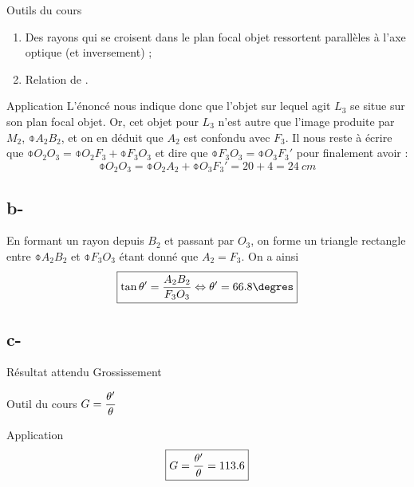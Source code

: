 \documentclass[10pt,a5paper,notitlepage]{book}
\begin{document}
\begin{NCdemo}{Outils du cours}
    \begin{enumerate}

        \item Des rayons qui se croisent dans le plan focal objet ressortent
            parallèles à l'axe optique (et inversement) ;

        \item Relation de .
    \end{enumerate}
\end{NCdemo}

\begin{NCexem}{Application}
    L'énoncé nous indique donc que l'objet sur lequel agit $L_3$ se situe sur
    son plan focal objet. Or, cet objet pour $L_3$ n'est autre que l'image
    produite par $M_2$, $\obar{A_2B_2}$, et on en déduit que $A_2$ est confondu
    avec $F_3$. Il nous reste à écrire que $\obar{O_2O_3} = \obar{O_2F_3} +
    \obar{F_3O_3}$ et dire que $\obar{F_3O_3} = \obar{O_3F_3'}$ pour finalement
    avoir :
    \[ \boxed{\obar{O_2O_3} = \obar{O_2A_2} + \obar{O_3F_3'} = 20 + 4 =
    \SI{24}{cm}} \]
\end{NCexem}

\setcounter{subsection}{2}
\subsection{b-}
En formant un rayon depuis $B_2$ et passant par $O_3$, on forme un triangle
rectangle entre $\obar{A_2B_2}$ et $ \obar{F_3O_3}$ étant donné que $A_2 = F_3$.
On a ainsi \[ \boxed{\tan\t' = \frac{A_2B_2}{F_3O_3} \Leftrightarrow \t' =
66.8\degres}\]

\setcounter{subsection}{2}
\subsection{c-}
\begin{NCprop}{Résultat attendu}
    Grossissement
\end{NCprop}

\begin{NCdemo}{Outil du cours}
    $ \displaystyle G = \frac{\theta'}{\theta}$
\end{NCdemo}

\begin{NCexem}{Application}
    \[ \boxed{G = \frac{\theta'}{\theta} = 113.6} \]
\end{NCexem}
\end{document}
